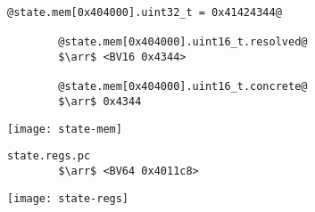 \documentclass[xcolor={dvipsnames}]{beamer}
\begin{document}
\begin{frame}[fragile]{}
    \begin{lstlisting}[style=hybrid2,gobble=8]
        @state.mem[0x404000].uint32_t = 0x41424344@
        
        @state.mem[0x404000].uint16_t.resolved@
        $\arr$ <BV16 0x4344>

        @state.mem[0x404000].uint16_t.concrete@
        $\arr$ 0x4344
    \end{lstlisting}
    \begin{center}
        
    \end{center}
\end{frame}
\begin{frame}{}
    \begin{center}
        \texttt{[image: state-mem]}
    \end{center}
\end{frame}
\begin{frame}[fragile]{}
    \begin{lstlisting}[style=plain2,gobble=8]
        state.regs.pc
        $\arr$ <BV64 0x4011c8>
    \end{lstlisting}
    \vspace{-10pt}
    \begin{center}
        \texttt{[image: state-regs]}
    \end{center}
\end{frame}
\end{document}
